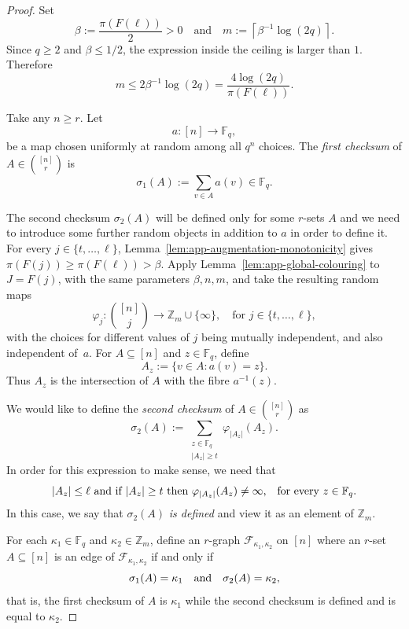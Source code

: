 \documentclass[12pt,a4paper]{article}
\numberwithin{equation}{section}
\theoremstyle{definition}
\theoremstyle{remark}
\newcommand{\Z}[1]{\mathbb Z_{#1}}
\newcommand{\CSOne}{\sigma_1}
\newcommand{\CSTwo}{\sigma_2}
\newcommand{\n}[2]{|#2_{#1}|}
\newcommand{\F}[2]{\mathcal F_{#1,#2}}
\newcommand{\PP}{m}
\renewcommand{\longrightarrow}{\to}
\begin{document}
\begin{proof}
Set
\[
 \beta:=\frac{\pi(F(\ell))}{2}>0
 \quad\text{and}\quad
 \PP:=\left\lceil\beta^{-1}\log(2q)\right\rceil.
\]
Since $q\ge2$ and $\beta\le1/2$, the expression inside the ceiling is larger than $1$.  Therefore
\begin{equation}\label{eq:app-P-bound}
 \PP\le2\beta^{-1}\log(2q)
 =\frac{4\log(2q)}{\pi(F(\ell))}.
\end{equation}

Take any $n\ge r$. Let
\[
 a:[n]\longrightarrow\mathbb F_q,
\]
 be a map chosen uniformly at random among all $q^n$ choices.
The \emph{first checksum} of $A\in \binom{[n]}{r}$ is
\[
\CSOne(A):=\sum_{v\in A} a(v)\in\mathbb F_q.
\]  

The second checksum $\CSTwo(A)$ will be defined only for some $r$-sets $A$ and we need to introduce some further random objects in addition to $a$ in order to define it. For every $j\in\{t,\ldots,\ell\}$, Lemma~\ref{lem:app-augmentation-monotonicity} gives
\(
\pi(F(j))\ge\pi(F(\ell))>\beta.
\)
Apply Lemma~\ref{lem:app-global-colouring} to $J=F(j)$, with the same parameters $\beta,n,\PP$, and take the resulting random maps
\[
\varphi_j:\binom{[n]}j\longrightarrow
\Z{\PP}\cup\{\infty\},\quad \text{for  $j\in \{t,\ldots,\ell\}$},
\]
with the choices for different values of $j$ being mutually independent, and also independent of~$a$. For $A\subseteq[n]$ and $z\in\mathbb F_q$, define
\[
 A_z:=\{v\in A:a(v)=z\}
.
\]
 Thus $A_z$ is the intersection of $A$ with the fibre $a^{-1}(z)$.
 
We would like to define the  \emph{second checksum} of $A\in \binom{[n]}r$ as
 \[
 \CSTwo(A):=\sum_{\substack{z\in\mathbb F_q\\ \n{z}{A}\ge t}}\varphi_{\n{z}{A}}(A_z).
 \] 
 In order for this expression to make sense, we need that
 \[
 \text{$\n{z}{A}\le \ell$ and if $\n{z}{A}\ge t$ then $\varphi_{\n{z}{A}}(A_z)\not=\infty$,\quad for every $z\in\mathbb F_q$.}
 \] In this case, we say that $\CSTwo(A)$ \emph{is defined} and view it as an element of $\Z{\PP}$.
 
 
For each $\kappa_1\in\mathbb F_q$ and $\kappa_2\in \Z{\PP}$, define an $r$-graph $\F{\kappa_1}{\kappa_2}$ on $[n]$ where an $r$-set $A\subseteq [n]$ is an edge of $\F{\kappa_1}{\kappa_2}$ if and only if
\[
\text{$\CSOne(A)=\kappa_1$\quad and\quad $\CSTwo(A)=\kappa_2$,}
	\]
	that is, the first checksum of $A$ is $\kappa_1$ while the second checksum is defined and is equal to $\kappa_2$.


\end{proof}
\end{document}
